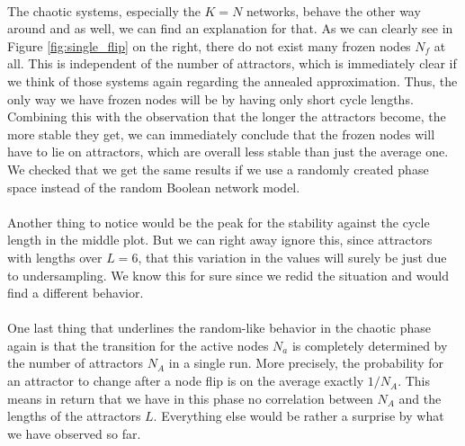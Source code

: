 \paragraph*{}
The chaotic systems, especially the $K=N$ networks, behave the other way around and as well, we can find an explanation for that. As we can clearly see in Figure \ref{fig:single_flip} on the right, there do not exist many frozen nodes $N_f$ at all. This is independent of the number of attractors, which is immediately clear if we think of those systems again regarding the annealed approximation. Thus, the only way we have frozen nodes will be by having only short cycle lengths. Combining this with the observation that the longer the attractors become, the more stable they get, we can immediately conclude that the frozen nodes will have to lie on attractors, which are overall less stable than just the average one. We checked that we get the same results if we use a randomly created phase space instead of the random Boolean network model.

\paragraph*{}
Another thing to notice would be the peak for the stability against the cycle length in the middle plot. But we can right away ignore this, since attractors with lengths over $L=6$, that this variation in the values will surely be just due to undersampling. We know this for sure since we redid the situation and would find a different behavior.

\paragraph*{}
One last thing that underlines the random-like behavior in the chaotic phase again is that the transition for the active nodes $N_a$ is completely determined by the number of attractors $N_A$ in a single run. More precisely, the probability for an attractor to change after a node flip is on the average exactly $1/N_A$. This means in return that we have in this phase no correlation between $N_A$ and the lengths of the attractors $L$. Everything else would be rather a surprise by what we have observed so far.

\newpage\thispagestyle{empty}
